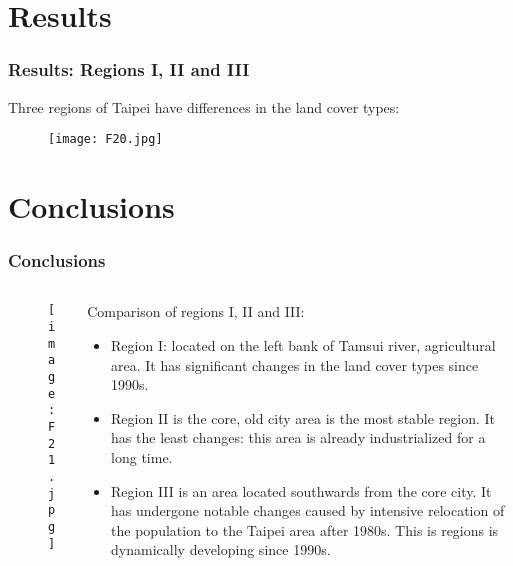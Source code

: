 \documentclass[pdflatex,compress,8pt,
	xcolor={dvipsnames,dvipsnames,svgnames,x11names,table},
	hyperref={	
	breaklinks = true, 
	pdfauthor={Lemenkova Polina}, 
	pdfsubject={Preentation}, 
	pdfcreator={Lemenkova Polina}, 
	pdfproducer={Lemenkova Polina}, 
	colorlinks=true,
	linkcolor=Gold1, 
	citecolor=NavyBlue, 
	urlcolor = NavyBlue, 
	breaklinks = true}]{beamer}
\begin{document}
\section{Results}
\begin{frame}\frametitle{Results: Regions I, II and III}
Three regions of Taipei have differences in the land cover types:
\begin{figure}[H]
	\centering
		\texttt{[image: F20.jpg]}
\end{figure}
\end{frame}

\section{Conclusions}
\begin{frame}\frametitle{Conclusions}
\begin{minipage}[0.4\textheight]{\textwidth}
\begin{columns}[T]
\begin{column}{0.5\textwidth}
\vspace{2em}
\begin{figure}[H]
	\centering
		\texttt{[image: F21.jpg]}
\end{figure}
\end{column}
\begin{column}{0.5\textwidth}
\vspace{2em}
Comparison of regions I, II and III:
\begin{itemize}
	\item Region I: located on the left bank of Tamsui river, agricultural area. It has significant changes in the land cover types since 1990s. \pause
	\item Region II is the core, old city area is the most stable region. It has the least changes: this area is already industrialized for a long time. \pause
	\item Region III is an area located southwards from the core city. It has undergone notable changes caused by intensive relocation of the population to the Taipei area after 1980s. This is regions is dynamically developing since 1990s.
\end{itemize}
\end{column}
\end{columns}
\end{minipage}
\end{frame}
\end{document}
